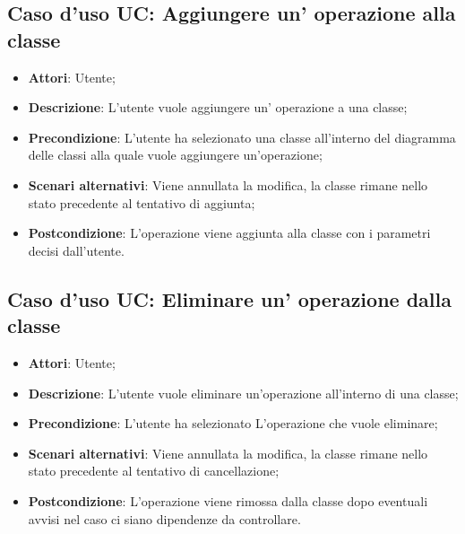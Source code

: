 \documentclass[../AnalisiDeiRequisiti.tex]{subfiles}
\begin{document}
	\subsection{Caso d'uso UC: Aggiungere un' operazione alla classe}
	\begin{itemize}
		\item \textbf{Attori}: Utente;
		
		\item \textbf{Descrizione}: L'utente vuole aggiungere un' operazione a una classe;
		
		\item \textbf{Precondizione}: L'utente ha selezionato una classe all'interno del diagramma delle classi alla quale vuole aggiungere un'operazione;
		
		\item \textbf{Scenari alternativi}: Viene annullata la modifica, la classe
		rimane nello stato precedente al tentativo di aggiunta;
		
		\item \textbf{Postcondizione}: L'operazione viene aggiunta alla classe con i parametri decisi dall'utente.
	\end{itemize}
	
	\subsection{Caso d'uso UC: Eliminare un' operazione dalla classe}
	\begin{itemize}
		\item \textbf{Attori}: Utente;
		
		\item \textbf{Descrizione}: L'utente vuole eliminare un'operazione all'interno di una classe;
		
		\item \textbf{Precondizione}: L'utente ha selezionato L'operazione che vuole eliminare;
		
		\item \textbf{Scenari alternativi}: Viene annullata la modifica, la classe
		rimane nello stato precedente al tentativo di cancellazione;
		
		\item \textbf{Postcondizione}: L'operazione viene rimossa dalla classe dopo
		eventuali avvisi nel caso ci siano dipendenze da controllare.
	\end{itemize}
	
\end{document}
